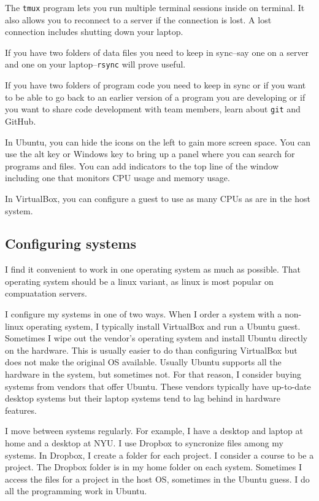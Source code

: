 \documentclass{article}
\let\code\texttt %
\begin{document}
The \code{tmux} program lets you run multiple terminal sessions inside
on terminal. It also allows you to reconnect to a server if the
connection is lost. A lost connection includes shutting down your
laptop.

If you have two folders of data files you need to keep in sync--say one
on a server and one on your laptop--\code{rsync} will prove useful.

If you have two folders of program code you need to keep in sync or if
you want to be able to go back to an earlier version of a program you
are developing or if you want to share code development with team
members, learn about \code{git} and GitHub. 

In Ubuntu, you can hide the icons on the left to gain more screen space.
You can use the alt key or Windows key to bring up a panel where you can
search for programs and files. You can add indicators to the top line of
the window including one that monitors CPU usage and memory usage.

In VirtualBox, you can configure a guest to use as many CPUs as are in
the host system.


\subsection{Configuring systems}

I find it convenient to work in one operating system as much as
possible. That operating system should be a linux variant, as linux is
most popular on compuatation servers.

I configure my systems in one of two ways. When I order a system with a
non-linux operating system, I typically install VirtualBox and run a
Ubuntu guest. Sometimes I wipe out the vendor's operating system and
install Ubuntu directly on the hardware. This is usually easier to do
than configuring VirtualBox but does not make the original OS available.
Usually Ubuntu supports all the hardware in the system, but sometimes
not. For that reason, I consider buying systems from vendors that offer
Ubuntu. These vendors typically have up-to-date desktop systems but
their laptop systems tend to lag behind in hardware features.   

I move between systems regularly. For example, I have a desktop and
laptop at home and a desktop at NYU. I use Dropbox to syncronize files
among my systems. In Dropbox, I create a folder for each project. I
consider a course to be a project. The Dropbox folder is in my home
folder on each system. Sometimes I access the files for a project in the
host OS, sometimes in the Ubuntu guess. I do all the programming work in
Ubuntu.
\end{document}
